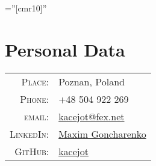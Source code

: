 \documentclass[a4paper,10pt]{article}
\begin{document}
\pagestyle{empty}
\font\fb=''[cmr10]''

\par{\bigskip\par}

\section{Personal Data}

\begin{tabular}{rl}
\textsc{Place:}                     & Poznan, Poland \\
\textsc{Phone:}                     & +48 504 922 269 \\
\textsc{email:}                     & \href{mailto:kacejot@fex.net}{kacejot@fex.net} \\
\textsc{LinkedIn:}                  & \href{https://www.linkedin.com/in/max-goncharenko-342197118/}{Maxim Goncharenko} \\
\textsc{GitHub:}                    & \href{https://github.com/kacejot}{kacejot} \\
\end{tabular}
\end{document}
